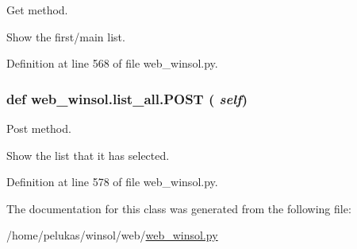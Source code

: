 Get method. 

Show the first/main list. 

Definition at line 568 of file web\_\-winsol.py.\hypertarget{classweb__winsol_1_1list__all_bc9054db27eade291e6144f52157e6b4}{
\subsubsection[POST]{\setlength{\rightskip}{0pt plus 5cm}def web\_\-winsol.list\_\-all.POST ( {\em self})}}
\label{classweb__winsol_1_1list__all_bc9054db27eade291e6144f52157e6b4}


Post method. 

Show the list that it has selected. 

Definition at line 578 of file web\_\-winsol.py.

The documentation for this class was generated from the following file:\begin{CompactItemize}
\item 
/home/pelukas/winsol/web/\hyperlink{web__winsol_8py}{web\_\-winsol.py}\end{CompactItemize}
